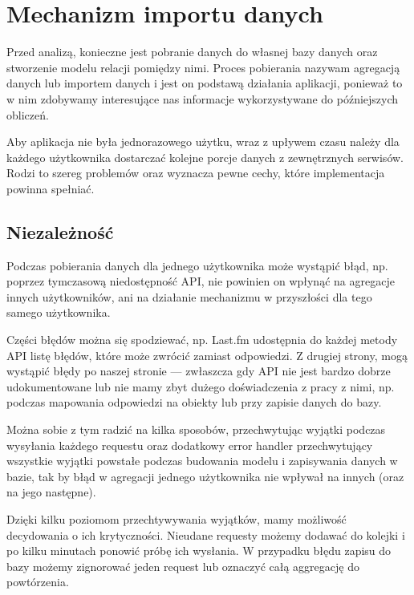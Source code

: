 \documentclass[openright]{xmgr}
\begin{document}
    \section{Mechanizm importu danych}
        Przed analizą, konieczne jest pobranie danych do własnej bazy danych oraz stworzenie modelu relacji pomiędzy nimi.
        Proces pobierania nazywam agregacją danych lub importem danych i jest on podstawą działania aplikacji,
        ponieważ to w nim zdobywamy interesujące nas informacje wykorzystywane do późniejszych obliczeń.

        Aby aplikacja nie była jednorazowego użytku, wraz z upływem czasu należy dla każdego użytkownika dostarczać
        kolejne porcje danych z zewnętrznych serwisów.
        Rodzi to szereg problemów oraz wyznacza pewne cechy, które implementacja powinna spełniać.

        \subsection*{Niezależność}
            Podczas pobierania danych dla jednego użytkownika może wystąpić błąd, np. poprzez tymczasową niedostępność API,
            nie powinien on wpłynąć na agregacje innych użytkowników, ani na działanie mechanizmu w przyszłości dla tego samego użytkownika.

            Części błędów można się spodziewać, np. Last.fm udostępnia do każdej metody API listę błędów, które może zwrócić zamiast odpowiedzi.
            Z drugiej strony, mogą wystąpić błędy po naszej stronie --- zwłaszcza gdy API nie jest bardzo dobrze udokumentowane
            lub nie mamy zbyt dużego doświadczenia z pracy z nimi, np. podczas mapowania odpowiedzi na obiekty lub przy zapisie danych do bazy.

            Można sobie z tym radzić na kilka sposobów, przechwytując wyjątki podczas wysyłania każdego requestu
            oraz dodatkowy error handler przechwytujący wszystkie wyjątki powstałe podczas budowania modelu i zapisywania danych w bazie,
            tak by błąd w agregacji jednego użytkownika nie wpływał na innych (oraz na jego następne).

            Dzięki kilku poziomom przechtywywania wyjątków, mamy możliwość decydowania o ich krytyczności.
            Nieudane requesty możemy dodawać do kolejki i po kilku minutach ponowić próbę ich wysłania.
            W przypadku błędu zapisu do bazy możemy zignorować jeden request lub oznaczyć całą aggregację do powtórzenia.
\end{document}

